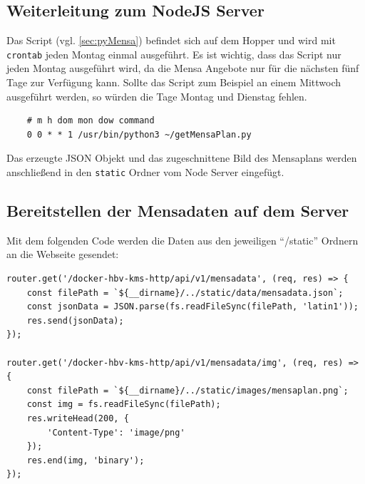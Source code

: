 \subsection{Weiterleitung zum NodeJS Server}

Das Script (vgl. \ref{sec:pyMensa}) befindet sich auf dem Hopper und wird mit \verb|crontab| jeden Montag einmal ausgeführt. Es ist wichtig, dass das Script nur jeden Montag ausgeführt wird, da die Mensa Angebote nur für die nächsten fünf Tage zur Verfügung kann. Sollte das Script zum Beispiel an einem Mittwoch ausgeführt werden, so würden die Tage Montag und Dienstag fehlen.\\

\begin{lstlisting}
    # m h dom mon dow command
    0 0 * * 1 /usr/bin/python3 ~/getMensaPlan.py
\end{lstlisting}

Das erzeugte JSON Objekt und das zugeschnittene Bild des Mensaplans werden anschließend in den \verb|static| Ordner vom Node Server eingefügt.

\subsection{Bereitstellen der Mensadaten auf dem Server}

Mit dem folgenden Code werden die Daten aus den jeweiligen “/static” Ordnern an die Webseite gesendet:\\

\begin{lstlisting}
router.get('/docker-hbv-kms-http/api/v1/mensadata', (req, res) => {
    const filePath = `${__dirname}/../static/data/mensadata.json`;
    const jsonData = JSON.parse(fs.readFileSync(filePath, 'latin1'));
    res.send(jsonData);
});

router.get('/docker-hbv-kms-http/api/v1/mensadata/img', (req, res) => {
    const filePath = `${__dirname}/../static/images/mensaplan.png`;
    const img = fs.readFileSync(filePath);
    res.writeHead(200, {
        'Content-Type': 'image/png'
    });
    res.end(img, 'binary');
});    
\end{lstlisting}

